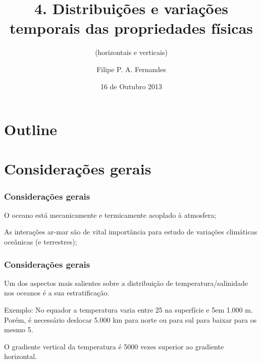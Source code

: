 \title[Aula 06]{4. Distribuições e variações temporais das propriedades físicas}
\subtitle{(horizontais e verticais)}
\author[Filipe Fernandes]{Filipe P. A. Fernandes}
\date[Outubro 2013]{16 de Outubro 2013}




\begin{frame}[plain]
  \titlepage
\end{frame}

\section*{Outline}
\begin{frame}
\tableofcontents
\end{frame}


\section{Considerações gerais}
\begin{frame}
  \frametitle{Considerações gerais}
  \begin{block}{}
    O oceano está mecanicamente e termicamente acoplado à atmosfera;

    As interações ar-mar são de vital importância para estudo de
    variações climáticas oceânicas (e terrestres);
  \end{block}
\end{frame}


\begin{frame}
  \frametitle{Considerações gerais}
  \begin{block}{}
    Um dos aspectos mais salientes sobre a distribuição de temperatura/salinidade nos oceanos é a sua estratificação.

    Exemplo: No equador a temperatura varia entre 25\textcelsius{} na
   superfície e 5\textcelsius em 1.000 m.  Porém, é necessário deslocar
   5.000 km para norte ou para sul para baixar para os mesmo 5\textcelsius.

   O gradiente vertical da temperatura é 5000 vezes superior ao gradiente
   horizontal.
  \end{block}
\end{frame}


